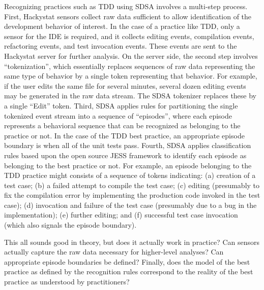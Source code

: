 Recognizing practices such as TDD using SDSA involves a multi-step
process. First, Hackystat sensors collect raw data sufficient to allow
identification of the development behavior of interest. In the case of a
practice like TDD, only a sensor for the IDE is required, and it collects
editing events, compilation events, refactoring events, and test invocation
events.  These events are sent to the Hackystat server for further
analysis.  On the server side, the second step
involves ``tokenization'', which essentially replaces sequences of raw data
representing the same type of behavior by a single token representing that
behavior. For example, if the user edits the same file for several minutes,
several dozen editing events may be generated in the raw data stream. The
SDSA tokenizer replaces these by a single ``Edit'' token. Third, SDSA
applies rules for partitioning the single tokenized event stream into a
sequence of ``episodes'', where each episode represents a behavioral
sequence that can be recognized as belonging to the practice or not.  In
the case of the TDD best practice, an appropriate episode boundary is when
all of the unit tests pass.  Fourth, SDSA applies classification rules based 
upon the open source JESS framework \cite{Friedman-Hill:03} to
identify each episode as belonging to the best practice or not.  For
example, an episode belonging to the TDD practice might consists of a
sequence of tokens indicating: (a) creation of a test case; (b) a failed
attempt to compile the test case; (c) editing (presumably to fix the
compilation error by implementing the production code invoked in the test
case); (d) invocation and failure of the test case (presumably due to a bug
in the implementation); (e) further editing; and (f) successful test case
invocation (which also signals the episode boundary).

This all sounds good in theory, but does it actually work in practice?  Can
sensors actually capture the raw data necessary for higher-level analyses? 
Can appropriate episode boundaries be defined? Finally, does the model of 
the best practice as defined by the recognition rules correspond to the 
reality of the best practice as understood by practitioners? 


